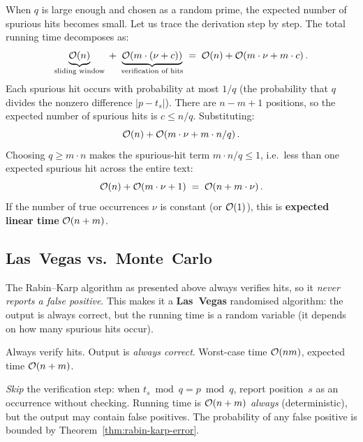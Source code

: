When $q$ is large enough and chosen as a random prime, the expected
number of spurious hits becomes small.
Let us trace the derivation step by step.
The total running time decomposes as:
\[
  \underbrace{\mathcal{O}\!\left(n\right)}_{\text{sliding window}}
  \;+\;
  \underbrace{\mathcal{O}\!\left(m \cdot (\nu + c)\right)}_{\text{verification of hits}}
  \;=\;
  \mathcal{O}\!\left(n\right) + \mathcal{O}\!\left(m \cdot \nu + m \cdot c\right).
\]
Each spurious hit occurs with probability at most $1/q$ (the
probability that $q$ divides the nonzero difference $|p - t_s|$).
There are $n - m + 1$ positions, so the expected number of spurious
hits is $c \le n/q$.
Substituting:
\[
  \mathcal{O}\!\left(n\right) + \mathcal{O}\!\left(m\cdot\nu + m \cdot n/q\right).
\]
Choosing $q \ge m \cdot n$ makes the spurious-hit term
$m \cdot n/q \le 1$, i.e.\ less than one expected spurious hit across
the entire text:
\[
  \mathcal{O}\!\left(n\right) + \mathcal{O}\!\left(m\cdot\nu + 1\right) \;=\; \mathcal{O}\!\left(n + m\cdot\nu\right).
\]
If the number of true occurrences $\nu$ is constant (or $\mathcal{O}\!\left(1\right)$),
this is \textbf{expected linear time} $\mathcal{O}\!\left(n + m\right)$.


\subsection{Las~Vegas vs.\ Monte~Carlo}

The Rabin--Karp algorithm as presented above always verifies hits, so it
\emph{never reports a false positive}.
This makes it a \textbf{Las~Vegas} randomised algorithm: the output is
always correct, but the running time is a random variable (it depends on
how many spurious hits occur).

\begin{description}[style=nextline, leftmargin=2cm]
  \item[Las~Vegas variant.]
    Always verify hits.
    Output is \emph{always correct}.
    Worst-case time $\mathcal{O}\!\left(nm\right)$, expected time $\mathcal{O}\!\left(n + m\right)$.

  \item[Monte~Carlo variant.]
    \emph{Skip} the verification step: when
    $t_s \bmod q = p \bmod q$, report position~$s$ as an occurrence
    without checking.
    Running time is $\mathcal{O}\!\left(n + m\right)$ \emph{always} (deterministic), but
    the output may contain false positives.
    The probability of any false positive is bounded by
    Theorem~\ref{thm:rabin-karp-error}.
\end{description}

